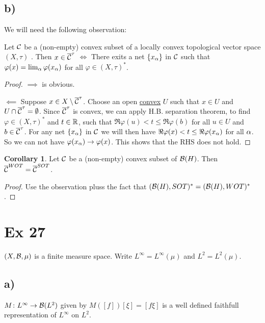 \documentclass[10pt,english,a4paper]{article}
\theoremstyle{definition}
\newtheorem*{corollary}{Corollary}
\def\Linf{L^{\infty}}
\def\vphi{\varphi}
\begin{document}
\subsection*{b)}
We will need the following observation:

Let $\mathcal{C}$ be a (non-empty) convex subset of a locally convex topological 
vector space $(X,\tau)$ .
Then $x \in \overline{\mathcal{C}}^{\tau} $ $\iff$ There exits a net $\{x_{\alpha}\}$
in $\mathcal{C}$ such that $\vphi(x) = \lim_{\al}\vphi(x_{\al})$ for all $\vphi \in (X,\tau)^*$.

\begin{proof}
    $\implies $ is obvious. 

$\impliedby$ Suppose $x \in X\setminus \overline{\mathcal{C}}^{\tau}$. Choose an open \ul{convex}
$U$ such that $x \in  U$ and $U\cap \overline{\mathcal{C}}^{\tau} = \emptyset$. Since 
$\overline{\mathcal{C}}^{\tau}$ is convex, we can apply H.B. separation theorem, to find 
$\vphi \in (X,\tau)^*$ and $t \in \mathbb{R}$, such that 
$\Re\vphi(u)< t \leq \Re\vphi(b)$ for all $u \in U$ and $b \in \overline{\mathcal{C}}^{\tau}$.
For any net $\{x_{\alpha}\}$ in $\mathcal{C}$ we will then have $\Re\vphi(x) < t \leq \Re\vphi(x_{\al})$
for all $\alpha$. So we can not have $\vphi(x_{\al})\to\vphi(x)$. This shows that 
the RHS does not hold. 
\end{proof}

\begin{corollary}
    Let $\mathcal{C}$ be a (non-empty) convex subset of $\mathcal{B}(H)$. 
Then $\overline{\mathcal{C}}^{WOT} = \overline{\mathcal{C}}^{SOT}$.
\end{corollary}
\begin{proof}
    Use the observation pluss the fact that 
$(\mathcal{B}(H), SOT)^* = (\mathcal{B}(H), WOT)^*$.
\end{proof}


\section*{Ex 27}
$(X, \mathcal{B}, \mu)$ is a finite measure space. Write $L^{\infty} = L^{\infty}(\mu)$
and $L^2 = L^{2}(\mu)$.

\subsection*{a)}
$M\colon L^{\infty} \to \mathcal{B}(L^2)$ given by $M([f])[\xi] = [f\xi]$ is a well defined 
faithfull representation of $\Linf$ on $L^2$. 
\end{document}

